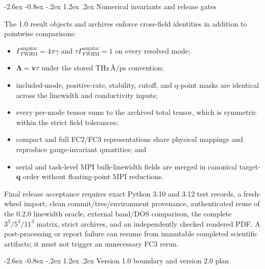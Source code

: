 \documentclass[11pt,a4paper]{article}
\makeatletter
\renewcommand\section{\@startsection{section}{1}{\z@}%
  {-2.6ex \@plus -0.8ex \@minus -.2ex}%
  {1.2ex \@plus .2ex}%
  {\normalfont\Large\sffamily\bfseries\color{ink}}}
\newcommand{\vect}[1]{\bm{#1}}
\newcommand{\q}{\vect{q}}
\makeatother
\begin{document}
\clearpage
\section{Numerical invariants and release gates}

The 1.0 result objects and archives enforce cross-field identities in addition
to pointwise comparisons:
\begin{itemize}
  \item $\Gamma_{\mathrm{FWHM}}^{\mathrm{angular}}=4\pi\gamma$ and
  $\tau\Gamma_{\mathrm{FWHM}}^{\mathrm{angular}}=1$ on every resolved mode;
  \item $\vect{\Lambda}=\vect{v}\tau$ under the stored THz\,\AA/ps convention;
  \item included-mode, positive-rate, stability, cutoff, and q-point masks are
  identical across the linewidth and conductivity inputs;
  \item every per-mode tensor sums to the archived total tensor, which is
  symmetric within the strict field tolerances;
  \item compact and full FC2/FC3 representations share physical mappings and
  reproduce gauge-invariant quantities; and
  \item serial and task-level MPI bulk-linewidth fields are merged in canonical
  target-$\q$ order without floating-point MPI reductions.
\end{itemize}

Final release acceptance requires exact Python 3.10 and 3.12 test records, a
fresh-wheel import, clean commit/tree/environment provenance, authenticated
reuse of the 0.2.0 linewidth oracle, external band/DOS comparison, the complete
$3^3/5^3/11^3$ matrix, strict archives, and an independently checked rendered
PDF. A post-processing or report failure can resume from immutable completed
scientific artifacts; it must not trigger an unnecessary FC3 rerun.

\section{Version 1.0 boundary and version 2.0 plan}
\end{document}
